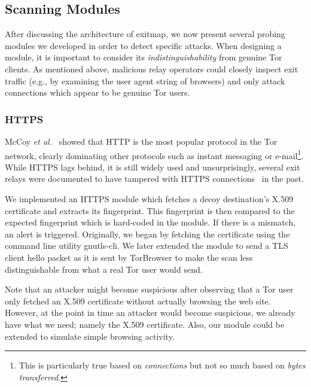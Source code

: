 \documentclass[letterpaper,twocolumn,10pt]{article}
\begin{document}
\subsection{Scanning Modules}
\label{sec:modules}
After discussing the architecture of \textsf{exitmap}, we now present several probing modules we
developed in order to detect specific attacks.  When designing a module, it is important to consider
its \emph{indistinguishability} from genuine Tor clients.  As mentioned above, malicious relay
operators could closely inspect exit traffic (e.g., by examining the user agent string of browsers)
and only attack connections which appear to be genuine Tor users.

\subsubsection{HTTPS}
McCoy \emph{et al.}~\cite{McCoy2008} showed that HTTP is the most popular protocol in the Tor
network, clearly dominating other protocols such as instant messaging or e-mail\footnote{This is
particularly true based on \emph{connections} but not so much based on \emph{bytes
transferred}.}.  While HTTPS lags behind, it is still widely used and unsurprisingly, several exit
relays were documented to have tampered with HTTPS connections~\cite{badexits} in the past.

We implemented an HTTPS module which fetches a decoy destination's X.509 certificate and extracts
its fingerprint.  This fingerprint is then compared to the expected fingerprint which is hard-coded
in the module.  If there is a mismatch, an alert is triggered.  Originally, we began by fetching the
certificate using the command line utility \textsf{gnutls-cli}.  We later extended the module to
send a TLS client hello packet as it is sent by TorBrowser to make the scan less distinguishable
from what a real Tor user would send.

Note that an attacker might become suspicious after observing that a Tor user only fetched an X.509
certificate without actually browsing the web site.  However, at the point in time an attacker would
become suspicious, we already have what we need; namely the X.509 certificate.  Also, our module
could be extended to simulate simple browsing activity.
\end{document}
